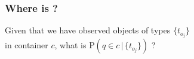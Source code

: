 \begin{frame}
  \frametitle{Where is ?}
  \begin{center}

    \vspace{0.3in}

    Given that we have observed objects of types $\{t_{o_j}\}$ \\
    in container $c$, what is $\mathrm{P}(q \in c \, | \, \{t_{o_j}\})$ ?
  \end{center}
\end{frame}

